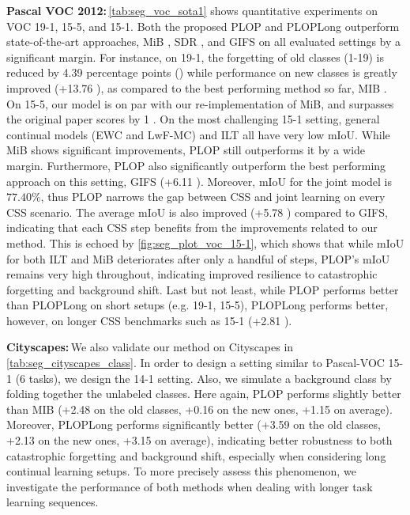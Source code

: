 \noindent\textbf{Pascal VOC 2012:\,}\autoref{tab:seg_voc_sota1} shows quantitative experiments on
VOC 19-1, 15-5, and 15-1. Both the proposed PLOP and PLOPLong outperform state-of-the-art
approaches, MiB \cite{cermelli2020modelingthebackground}, SDR \cite{michieli2021sdr}, and GIFS
\cite{cermelli2020fewshotcontinualsegm} on all evaluated settings by a significant margin. For
instance, on 19-1, the forgetting of old classes (1-19) is reduced by 4.39 percentage points (\pp)
while performance on new classes is greatly improved (+13.76 \pp), as compared to the best
performing method so far, MIB \cite{cermelli2020modelingthebackground}. On 15-5, our model is on par
with our re-implementation of MiB, and surpasses the original paper scores
\cite{cermelli2020modelingthebackground} by 1 \pp. On the most challenging 15-1 setting, general
continual models (EWC and LwF-MC) and ILT all have very low \ac{mIoU}. While MiB shows significant
improvements, PLOP still outperforms it by a wide margin. Furthermore, PLOP also significantly
outperform the best performing approach on this setting, GIFS
\cite{cermelli2020fewshotcontinualsegm} (+6.11 \pp). Moreover, \ac{mIoU} for the joint model is
$77.40\%$, thus PLOP narrows the gap between \ac{CSS} and joint learning on every \ac{CSS} scenario. The
average \ac{mIoU} is also improved (+5.78 \pp) compared to GIFS, indicating that each \ac{CSS} step
benefits from the improvements related to our method. This is echoed by
\autoref{fig:seg_plot_voc_15-1}, which shows that while \ac{mIoU} for both ILT and MiB deteriorates
after only a handful of steps, PLOP's \ac{mIoU} remains very high throughout, indicating improved
resilience to catastrophic forgetting and background shift. Last but not least, while PLOP performs
better than PLOPLong on short setups (e.g. 19-1, 15-5), PLOPLong performs better, however, on longer
\ac{CSS} benchmarks such as 15-1 (+2.81 \pp).



\noindent\textbf{Cityscapes:\,}We also validate our method on Cityscapes in
\autoref{tab:seg_cityscapes_class}. In order to design a setting similar to Pascal-VOC 15-1 (6
tasks), we design the 14-1 setting. Also, we simulate a background class by folding together the
unlabeled classes. Here again, PLOP performs slightly better than MIB (+2.48 \pp on the old classes,
+0.16 \pp on the new ones, +1.15 \pp on average). Moreover, PLOPLong performs significantly better
(+3.59 \pp on the old classes, +2.13 \pp on the new ones, +3.15 \pp on average), indicating better
robustness to both catastrophic forgetting and background shift, especially when considering long
continual learning setups. To more precisely assess this phenomenon, we investigate the performance
of both methods when dealing with longer task learning sequences.

